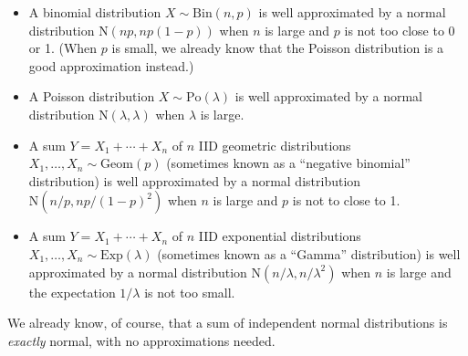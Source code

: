 \documentclass[
  a4paper,
]{book}
\theoremstyle{definition}
\theoremstyle{definition}
\theoremstyle{definition}
\theoremstyle{definition}
\theoremstyle{remark}
\begin{document}
\begin{itemize}
\item
  A binomial distribution \(X \sim \mathrm{Bin}(n, p)\) is well approximated by a normal distribution \(\mathrm{N}(np, np(1-p))\) when \(n\) is large and \(p\) is not too close to 0 or 1. (When \(p\) is small, we already know that the Poisson distribution is a good approximation instead.)
\item
  A Poisson distribution \(X \sim \mathrm{Po}(\lambda)\) is well approximated by a normal distribution \(\mathrm{N}(\lambda, \lambda)\) when \(\lambda\) is large.
\item
  A sum \(Y = X_1 + \cdots + X_n\) of \(n\) IID geometric distributions \(X_1, \dots, X_n \sim \mathrm{Geom}(p)\) (sometimes known as a ``negative binomial'' distribution) is well approximated by a normal distribution \(\mathrm{N}(n/p, np/(1-p)^2)\) when \(n\) is large and \(p\) is not to close to 1.
\item
  A sum \(Y = X_1 + \cdots + X_n\) of \(n\) IID exponential distributions \(X_1, \dots, X_n \sim \mathrm{Exp}(\lambda)\) (sometimes known as a ``Gamma'' distribution) is well approximated by a normal distribution \(\mathrm{N}(n/\lambda, n/\lambda^2)\) when \(n\) is large and the expectation \(1/\lambda\) is not too small.
\end{itemize}

We already know, of course, that a sum of independent normal distributions is \emph{exactly} normal, with no approximations needed.
\end{document}
